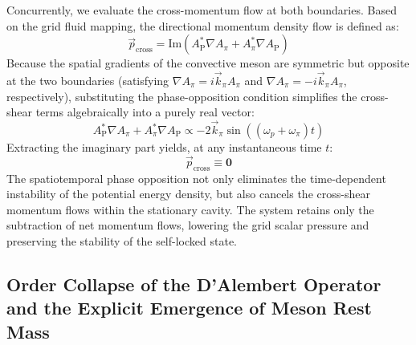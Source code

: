 \documentclass[12pt, a4paper]{article}
\begin{document}
Concurrently, we evaluate the cross-momentum flow at both boundaries. Based on the grid fluid mapping, the directional momentum density flow is defined as:
\begin{equation}
\vec{p}_{\mathrm{cross}} = \mathrm{Im}\left( A_{\mathrm{P}}^* \nabla A_\pi + A_\pi^* \nabla A_{\mathrm{P}} \right)
\end{equation}
Because the spatial gradients of the convective meson are symmetric but opposite at the two boundaries (satisfying $\nabla A_\pi = i \vec{k}_\pi A_\pi$ and $\nabla A_\pi = -i \vec{k}_\pi A_\pi$, respectively), substituting the phase-opposition condition simplifies the cross-shear terms algebraically into a purely real vector:
\begin{equation}
A_{\mathrm{P}}^* \nabla A_\pi + A_\pi^* \nabla A_{\mathrm{P}} \propto -2 \vec{k}_\pi \sin((\omega_p + \omega_\pi)t)
\end{equation}
Extracting the imaginary part yields, at any instantaneous time $t$:
\begin{equation}
\vec{p}_{\mathrm{cross}} \equiv \mathbf{0}
\end{equation}
The spatiotemporal phase opposition not only eliminates the time-dependent instability of the potential energy density, but also cancels the cross-shear momentum flows within the stationary cavity. The system retains only the subtraction of net momentum flows, lowering the grid scalar pressure and preserving the stability of the self-locked state.

\subsection{Order Collapse of the D'Alembert Operator and the Explicit Emergence of Meson Rest Mass}
\end{document}
